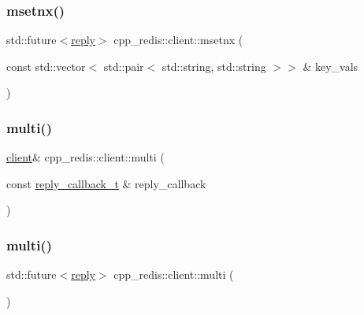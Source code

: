 \mbox{\label{classcpp__redis_1_1client_a792ed8b2d5f3a38e8b9dfaef7f814d19}} 
\subsubsection{\texorpdfstring{msetnx()}{msetnx()}\hspace{0.1cm}{\footnotesize\ttfamily [2/2]}}
{\footnotesize\ttfamily std\+::future$<$\hyperlink{classcpp__redis_1_1reply}{reply}$>$ cpp\+\_\+redis\+::client\+::msetnx (\begin{DoxyParamCaption}\item[{const std\+::vector$<$ std\+::pair$<$ std\+::string, std\+::string $>$$>$ \&}]{key\+\_\+vals }\end{DoxyParamCaption})}

\mbox{\label{classcpp__redis_1_1client_af760234ec07174ae23d223c14df4e1bb}} 
\subsubsection{\texorpdfstring{multi()}{multi()}\hspace{0.1cm}{\footnotesize\ttfamily [1/2]}}
{\footnotesize\ttfamily \hyperlink{classcpp__redis_1_1client}{client}\& cpp\+\_\+redis\+::client\+::multi (\begin{DoxyParamCaption}\item[{const \hyperlink{classcpp__redis_1_1client_a061a1140d36d2eaeda82b09a0bb3f9f2}{reply\+\_\+callback\+\_\+t} \&}]{reply\+\_\+callback }\end{DoxyParamCaption})}

\mbox{\label{classcpp__redis_1_1client_afceccda0873f1a9a7c2bc795e31c8126}} 
\subsubsection{\texorpdfstring{multi()}{multi()}\hspace{0.1cm}{\footnotesize\ttfamily [2/2]}}
{\footnotesize\ttfamily std\+::future$<$\hyperlink{classcpp__redis_1_1reply}{reply}$>$ cpp\+\_\+redis\+::client\+::multi (\begin{DoxyParamCaption}{ }\end{DoxyParamCaption})}

